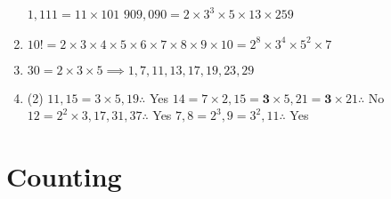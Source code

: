\documentclass[12pt, A4]{article}
\begin{document}
\begin{enumerate}
\begin{tasks}
							\task
								\(1,111 = 11 \times 101\)
							\task
								\(909,090 = 2 \times 3^3 \times 5 \times 13 \times 259\)
						\end{tasks}
					\setcounter{enumi}{4}
					\item
						\(10! = 2 \times 3 \times 4 \times 5 \times 6 \times 7 \times 8 \times 9 \times 10 = 2^8 \times 3^4 \times 5^2 \times 7\)
					\setcounter{enumi}{14}
					\item
						\(30 = 2 \times 3 \times 5 \implies 1, 7, 11, 13, 17, 19, 23, 29\)
					\setcounter{enumi}{16}
					\item
						\begin{tasks}(2)
							\task
								\(11, 15 = 3 \times 5, 19 \therefore\) Yes
							\task
								\(14 = 7 \times 2, 15 = \bm{3} \times 5, 21 = \bm{3} \times 21 \therefore\) No
							\task
								\(12 = 2^2 \times 3, 17, 31, 37 \therefore\) Yes
							\task
								\(7, 8 = 2^3, 9 = 3^2, 11 \therefore\) Yes
						\end{tasks}
				\end{enumerate}
	\setcounter{section}{5}
	\section{Counting}
\end{document}
